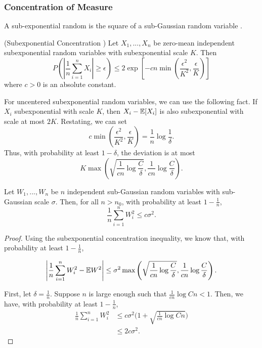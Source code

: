 \subsubsection{Concentration of Measure}

A sub-exponential random is the square of a sub-Gaussian random
variable \cite{vershynin2010introduction}.

\begin{proposition} (Subexponential Concentration
  \cite{vershynin2010introduction})
Let $X_1,...,X_n$ be zero-mean independent subexponential random
variables with subexponential scale $K$. 
Then
\[
P( | \frac{1}{n} \sum_{i=1}^n X_i | \geq \epsilon) \leq
	2 \exp \left[ -c n \min\left( \frac{\epsilon^2}{K^2}, \frac{\epsilon}{K} \right) \right]
\]
where $c > 0$ is an absolute constant.
\end{proposition}

For uncentered subexponential random variables, we can use the following fact. If $X_i$ subexponential with scale $K$, then $X_i - {\mathbb E}[X_i]$ is also subexponential with scale at most $2K$.
Restating, we can set
\[
c \min\left( \frac{\epsilon^2}{K^2}, \frac{\epsilon}{K} \right) = \frac{1}{n} \log \frac{1}{\delta}.
\]
Thus, with probability at least $1-\delta$, the deviation is at most
\[
K \max\left( \sqrt{\frac{1}{cn} \log \frac{C}{\delta}},  \frac{1}{cn} \log \frac{C}{\delta} \right).
\]


\begin{corollary}
Let $W_1,...,W_n$ be $n$ independent sub-Gaussian random variables with sub-Gaussian scale $\sigma$. 
Then, for all $n > n_0$, with probability at least $1- \frac{1}{n}$,
\[
\frac{1}{n} \sum_{i=1}^n W_i^2 \leq c \sigma^2 .
\]
\end{corollary}

\begin{proof}
Using the subexponential concentration inequality, we know that, with probability at least $1-\frac{1}{n}$, 

\[
\left| \frac{1}{n} \sum_{i=1}^n W_i^2 - {\mathbb E} W^2\right| \leq \sigma^2 \max\left( \sqrt{\frac{1}{cn} \log \frac{C}{\delta}}, \frac{1}{cn}\log \frac{C}{\delta} \right).
\]

First, let $\delta = \frac{1}{n}$. Suppose $n$ is large enough such that $ \frac{1}{cn} \log Cn < 1$. Then, we have, with probability at least $1-\frac{1}{n}$,
\begin{align*}
 \frac{1}{n} \sum_{i=1}^n W_i^2 &\leq c\sigma^2 \Big(1+\sqrt{\frac{1}{cn} \log Cn}\Big) \\
		&\leq 2 c \sigma^2.
 \end{align*}
\end{proof}


